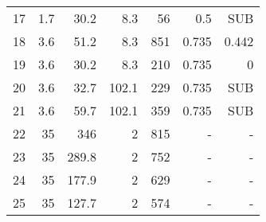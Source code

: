 \documentclass[review,3p]{elsarticle}
\begin{document}
\begin{table}[H]
\begin{tabular}{rrrrrrr}
17 & 1.7 & 30.2 & 8.3 & 56 & 0.5 & SUB \\

18 & 3.6 & 51.2 & 8.3 & 851 & 0.735 & 0.442 \\

19 & 3.6 & 30.2 & 8.3 & 210 & 0.735 &  0 \\

20 & 3.6 & 32.7 & 102.1 & 229 & 0.735 & SUB \\

21 & 3.6 & 59.7 & 102.1 & 359 & 0.735 & SUB \\

22 & 35 & 346 &  2 & 815 &  - &  - \\

23 & 35 & 289.8 &  2 & 752 &  - &  - \\

24 & 35 & 177.9 &  2 & 629 &  - &  - \\

25 & 35 & 127.7 &  2 & 574 &  - &  - \\
\bottomrule
\end{tabular}  




\label{tab:statePointsKalinaRH}
\end{table}
\end{document}
